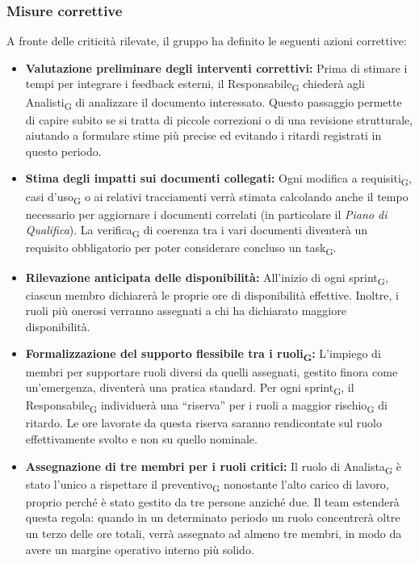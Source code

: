 ﻿\documentclass[a4paper, 10pt, colorlinks=true, linkcolor=black, urlcolor=blue, citecolor=blue, hidelinks]{article}
\begin{document}
\subsubsection{Misure correttive}
A fronte delle criticità rilevate, il gruppo ha definito le seguenti azioni correttive:
\begin{itemize}
    \item \textbf{Valutazione preliminare degli interventi correttivi:} Prima di stimare i tempi per integrare i feedback esterni, il Responsabile\textsubscript{G} chiederà agli Analisti\textsubscript{G} di analizzare il documento interessato. Questo passaggio permette di capire subito se si tratta di piccole correzioni o di una revisione strutturale, aiutando a formulare stime più precise ed evitando i ritardi registrati in questo periodo.

    \item \textbf{Stima degli impatti sui documenti collegati:} Ogni modifica a requisiti\textsubscript{G}, casi d'uso\textsubscript{G} o ai relativi tracciamenti verrà stimata calcolando anche il tempo necessario per aggiornare i documenti correlati (in particolare il \textit{Piano di Qualifica}). La verifica\textsubscript{G} di coerenza tra i vari documenti diventerà un requisito obbligatorio per poter considerare concluso un task\textsubscript{G}.

    \item \textbf{Rilevazione anticipata delle disponibilità:} All'inizio di ogni sprint\textsubscript{G}, ciascun membro dichiarerà le proprie ore di disponibilità effettive. Inoltre, i ruoli più onerosi verranno assegnati a chi ha dichiarato maggiore disponibilità.

    \item \textbf{Formalizzazione del supporto flessibile tra i ruoli\textsubscript{G}:} L'impiego di membri per supportare ruoli diversi da quelli assegnati, gestito finora come un'emergenza, diventerà una pratica standard. Per ogni sprint\textsubscript{G}, il Responsabile\textsubscript{G} individuerà una ``riserva'' per i ruoli a maggior rischio\textsubscript{G} di ritardo. Le ore lavorate da questa riserva saranno rendicontate sul ruolo effettivamente svolto e non su quello nominale.

    \item \textbf{Assegnazione di tre membri per i ruoli critici:} Il ruolo di Analista\textsubscript{G} è stato l'unico a rispettare il preventivo\textsubscript{G} nonostante l'alto carico di lavoro, proprio perché è stato gestito da tre persone anziché due. Il team estenderà questa regola: quando in un determinato periodo un ruolo concentrerà oltre un terzo delle ore totali, verrà assegnato ad almeno tre membri, in modo da avere un margine operativo interno più solido.
\end{itemize}
\end{document}
